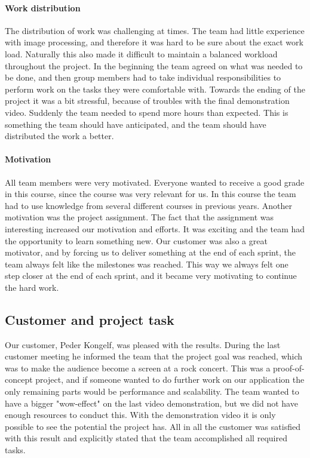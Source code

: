 \paragraph{Work distribution}
The distribution of work was challenging at times. 
The team had little experience with image processing, and therefore it was hard to be sure about the exact work load. Naturally this also made it difficult to maintain a balanced workload throughout the project. 
In the beginning the team agreed on what was needed to be done, and then group members had to take individual responsibilities to perform work on the tasks they were comfortable with. 
Towards the ending of the project it was a bit stressful, because of troubles with the final demonstration video. Suddenly the team needed to spend more hours than expected. This is something the team should have anticipated, and the team should have distributed the work a better.

\paragraph{Motivation}
All team members were very motivated. Everyone wanted to receive a good grade in this course, since the course was very relevant for us. In this course the team had to use knowledge from several different courses in previous years. Another motivation was the project assignment. The fact that the assignment was interesting increased our motivation and efforts. It was exciting and the team had the opportunity to learn something new. Our customer was also a great motivator, and by forcing us to deliver something at the end of each sprint, the team always felt like the milestones was reached. This way we always felt one step closer at the end of each sprint, and it became very motivating to continue the hard work. 

\subsection{Customer and project task} \label{txt:evaluation_customerandprojecttask}
Our customer, Peder Kongelf, was pleased with the results. During the last customer meeting he informed the team that the project goal was reached, which was to make the audience become a screen at a rock concert.
This was a proof-of-concept project, and if someone wanted to do further work on our application the only remaining parts would be performance and scalability. 
The team wanted to have a bigger "wow-effect" on the last video demonstration, but we did not have enough resources to conduct this. With the demonstration video it is only possible to see the potential the project has. All in all the customer was satisfied with this result and explicitly stated that the team accomplished all required tasks. 

